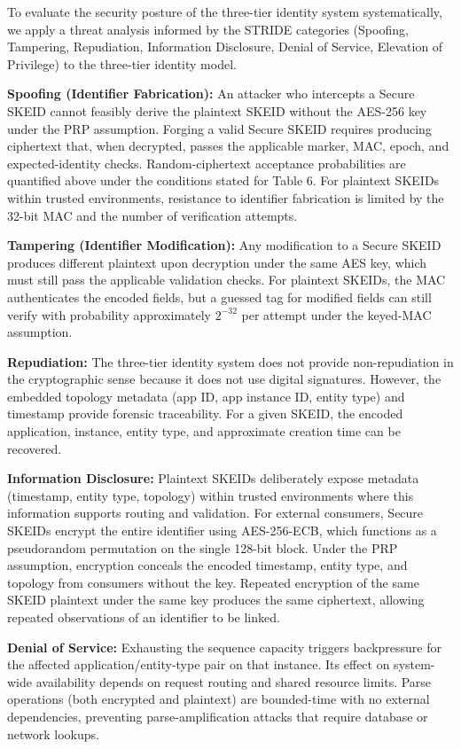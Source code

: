 \documentclass[a4paper,fleqn]{cas-sc}
\begin{document}
To evaluate the security posture of the three-tier identity system
systematically, we apply a threat analysis informed by the STRIDE
categories \citep{shostack2014} (Spoofing, Tampering, Repudiation,
Information Disclosure, Denial of Service, Elevation of Privilege) to
the three-tier identity model.

\textbf{Spoofing (Identifier Fabrication):} An attacker who intercepts a
Secure SKEID cannot feasibly derive the plaintext SKEID without the
AES-256 key under the PRP assumption. Forging a valid Secure SKEID
requires producing ciphertext that, when decrypted, passes the
applicable marker, MAC, epoch, and expected-identity checks.
Random-ciphertext acceptance probabilities are quantified above under
the conditions stated for Table 6. For plaintext SKEIDs within trusted
environments, resistance to identifier fabrication is limited by the
32-bit MAC and the number of verification attempts.

\textbf{Tampering (Identifier Modification):} Any modification to a
Secure SKEID produces different plaintext upon decryption under the same
AES key, which must still pass the applicable validation checks. For
plaintext SKEIDs, the MAC authenticates the encoded fields, but a
guessed tag for modified fields can still verify with probability
approximately \(2^{-32}\) per attempt under the keyed-MAC assumption.

\textbf{Repudiation:} The three-tier identity system does not provide
non-repudiation in the cryptographic sense because it does not use
digital signatures. However, the embedded topology metadata (app ID, app
instance ID, entity type) and timestamp provide forensic traceability.
For a given SKEID, the encoded application, instance, entity type, and
approximate creation time can be recovered.

\textbf{Information Disclosure:} Plaintext SKEIDs deliberately expose
metadata (timestamp, entity type, topology) within trusted environments
where this information supports routing and validation. For external
consumers, Secure SKEIDs encrypt the entire identifier using
AES-256-ECB, which functions as a pseudorandom permutation on the single
128-bit block. Under the PRP assumption, encryption conceals the encoded
timestamp, entity type, and topology from consumers without the key.
Repeated encryption of the same SKEID plaintext under the same key
produces the same ciphertext, allowing repeated observations of an
identifier to be linked.

\textbf{Denial of Service:} Exhausting the sequence capacity triggers
backpressure for the affected application/entity-type pair on that
instance. Its effect on system-wide availability depends on request
routing and shared resource limits. Parse operations (both encrypted and
plaintext) are bounded-time with no external dependencies, preventing
parse-amplification attacks that require database or network lookups.
\end{document}
